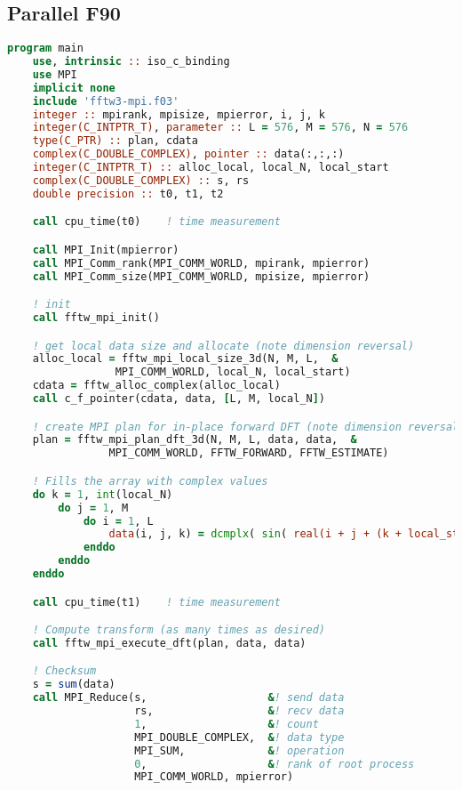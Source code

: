 \subsection{Parallel F90}
\begin{lstlisting}[language=Fortran, caption={Parallel F90 implementation of the FFT test case.}]
program main
    use, intrinsic :: iso_c_binding
    use MPI
    implicit none
    include 'fftw3-mpi.f03'
    integer :: mpirank, mpisize, mpierror, i, j, k
    integer(C_INTPTR_T), parameter :: L = 576, M = 576, N = 576
    type(C_PTR) :: plan, cdata
    complex(C_DOUBLE_COMPLEX), pointer :: data(:,:,:)
    integer(C_INTPTR_T) :: alloc_local, local_N, local_start
    complex(C_DOUBLE_COMPLEX) :: s, rs
    double precision :: t0, t1, t2

    call cpu_time(t0)    ! time measurement

    call MPI_Init(mpierror)
    call MPI_Comm_rank(MPI_COMM_WORLD, mpirank, mpierror)
    call MPI_Comm_size(MPI_COMM_WORLD, mpisize, mpierror)

    ! init
    call fftw_mpi_init()    

    ! get local data size and allocate (note dimension reversal)
    alloc_local = fftw_mpi_local_size_3d(N, M, L,  &
                 MPI_COMM_WORLD, local_N, local_start)
    cdata = fftw_alloc_complex(alloc_local)
    call c_f_pointer(cdata, data, [L, M, local_N])

    ! create MPI plan for in-place forward DFT (note dimension reversal)
    plan = fftw_mpi_plan_dft_3d(N, M, L, data, data,  &
                MPI_COMM_WORLD, FFTW_FORWARD, FFTW_ESTIMATE)

    ! Fills the array with complex values
    do k = 1, int(local_N)
        do j = 1, M
            do i = 1, L
                data(i, j, k) = dcmplx( sin( real(i + j + (k + local_start)) ) , 0)
            enddo
        enddo
    enddo

    call cpu_time(t1)    ! time measurement

    ! Compute transform (as many times as desired)
    call fftw_mpi_execute_dft(plan, data, data)

    ! Checksum
    s = sum(data)
    call MPI_Reduce(s,                   &! send data
                    rs,                  &! recv data
                    1,                   &! count
                    MPI_DOUBLE_COMPLEX,  &! data type
                    MPI_SUM,             &! operation
                    0,                   &! rank of root process
                    MPI_COMM_WORLD, mpierror)
    

\end{lstlisting}
